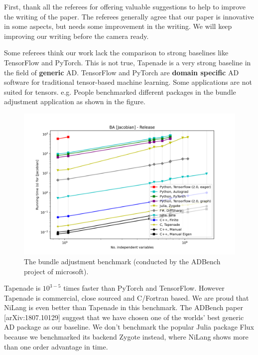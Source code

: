 \documentclass{article}
\begin{document}
First, thank all the referees for offering valuable suggestions to help to improve the writing of the paper.
The referees generally agree that our paper is innovative in some aspects, but needs some improvement in the writing.
We will keep improving our writing before the camera ready.

Some referees think our work lack the comparison to strong baselines like TensorFlow and PyTorch.
This is not true, Tapenade is a very strong baseline in the field of \textbf{generic} AD.
TensorFlow and PyTorch are \textbf{domain specific} AD software for traditional tensor-based machine learning.
Some applications are not suited for tensors.
e.g. People benchmarked different packages in the bundle adjustment application as shown in the figure.
\begin{figure}
    \centerline{\includegraphics[width=0.5\columnwidth,trim={0 1cm 1cm 1.7cm},clip]{ba-jacobian-adbench.png}}
    \caption{The bundle adjustment benchmark (conducted by the ADBench project of microsoft).}\label{bench-ba}
\end{figure}
Tapenade is $10^{3-5}$ times faster than PyTorch and TensorFlow. However Tapenade is commercial, close sourced and C/Fortran based.
We are proud that NiLang is even better than Tapenade in this benchmark.
The ADBench paper [arXiv:1807.10129] suggest that we have chosen one of the worlds' best generic AD package as our baseline.
We don't benchmark the popular Julia package Flux because we benchmarked its backend Zygote instead, where NiLang shows more than one order advantage in time.
\end{document}
